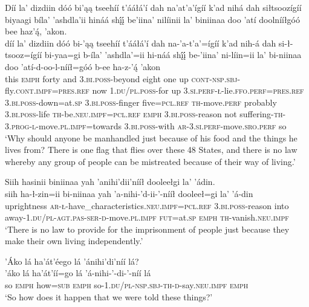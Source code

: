 \ea\label{ex:text7-3-4}
Díí la’ dizdiin dóó bi’ąą tseehíí t’ááłá’í dah na’at’a’ígíí k’ad nihá dah siłtsoozígíí biyaagi bíla’ ’ashdla’ii hináá shį́į́ be’iina’ nilíinii la’ biniinaa doo ’atí doolnííłgóó bee haz’ą́, ’akon.\\
\gll díí	la’	dizdiin	dóó	bi-’ąą	tseehíí	t’ááłá’í	dah	na-’a-t’a’=ígíí	k’ad	nih-á	dah	si-ł-tsooz=ígíí	bi-yaa=gi	b-íla’	’ashdla’=ii	hi-náá	shį́į́	be-’iina’	ni-líin=ii	la’	bi-niinaa	doo	’atí-d-oo-l-nííł=góó	b-ee	ha-z-’ą́	’akon\\
     this	\textsc{emph}	forty	and	3.\textsc{bi}.\textsc{poss}-beyond	eight	one	up	\textsc{cont}-\textsc{nsp}.\textsc{sbj}-fly.\textsc{cont}.\textsc{impf}=\textsc{pres}.\textsc{ref}	now	1.\textsc{du}/\textsc{pl}.\textsc{poss}-for	up	3.\textsc{si}.\textsc{perf}-\textsc{ł}-lie.\textsc{ffo}.\textsc{perf}=\textsc{pres}.\textsc{ref}	3.\textsc{bi}.\textsc{poss}-down=at.\textsc{sp}	3.\textsc{bi}.\textsc{poss}-finger	five=\textsc{pcl}.\textsc{ref}	\textsc{th}-move.\textsc{perf}	probably	3.\textsc{bi}.\textsc{poss}-life	\textsc{th}-be.\textsc{neu}.\textsc{impf}=\textsc{pcl}.\textsc{ref}	\textsc{emph}	3.\textsc{bi}.\textsc{poss}-reason	not	suffering-\textsc{th}-3.\textsc{prog}-\textsc{l}-move.\textsc{pl}.\textsc{impf}=towards	3.\textsc{bi}.\textsc{poss}-with	\textsc{ar}-3.\textsc{si}.\textsc{perf}-move.\textsc{sro}.\textsc{perf}	so\\
\glt `Why should anyone be manhandled just because of his food and the things he lives from? There is one flag that flies over these 48 States, and there is no law whereby any group of people can be mistreated because of their way of living.'
\z

\ea\label{ex:text7-3-5}
Siih hasinii biniinaa yah ’anihi’dii’nííł dooleełgi la’ ’ádin.\\
\gll siih ha-ł-zin=ii	bi-niinaa	yah	’a-nihi-’d-ii-’-nííł	dooleeł=gi	la’	’á-din\\
     uprightness \textsc{ar}-\textsc{ł}-have\_characteristics.\textsc{neu}.\textsc{impf}=\textsc{pcl}.\textsc{ref}	3.\textsc{bi}.\textsc{poss}-reason	into	away-1.\textsc{du}/\textsc{pl}-\textsc{agt}.\textsc{pas}-\textsc{ser}-\textsc{d}-move.\textsc{pl}.\textsc{impf}	\textsc{fut}=at.\textsc{sp}	\textsc{emph}	\textsc{th}-vanish.\textsc{neu}.\textsc{impf}\\
\glt `There is no law to provide for the imprisonment of people just because they make their own living independently.'
\z

\newpage
\ea\label{ex:text7-3-6}
’Áko lá ha’át’éego lá ’ánihi’di’níí lá?\\
\gll ’áko	lá	ha’át’íí=go	lá	’á-nihi-’-di-’-níí	lá\\
     so	\textsc{emph}	how=\textsc{sub}	\textsc{emph}	so-1.\textsc{du}/\textsc{pl}-\textsc{nsp}.\textsc{sbj}-\textsc{th}-\textsc{d}-say.\textsc{neu}.\textsc{impf}	\textsc{emph}\\
\glt `So how does it happen that we were told these things?'
\z

